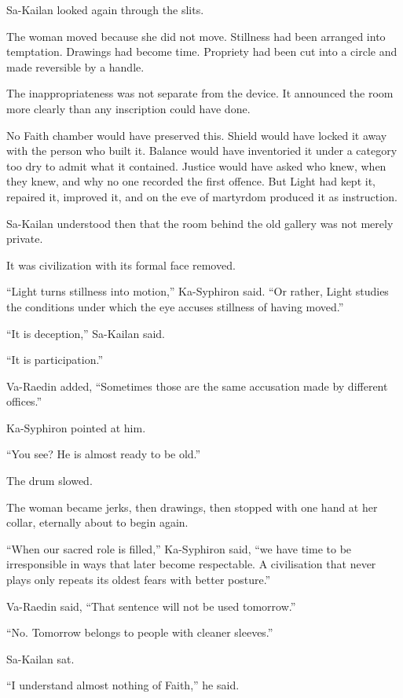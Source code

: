 Sa-Kailan looked again through the slits.\par
The woman moved because she did not move. Stillness had been arranged into temptation. Drawings had become time. Propriety had been cut into a circle and made reversible by a handle.\par
The inappropriateness was not separate from the device. It announced the room more clearly than any inscription could have done.\par
No Faith chamber would have preserved this. Shield would have locked it away with the person who built it. Balance would have inventoried it under a category too dry to admit what it contained. Justice would have asked who knew, when they knew, and why no one recorded the first offence. But Light had kept it, repaired it, improved it, and on the eve of martyrdom produced it as instruction.\par
Sa-Kailan understood then that the room behind the old gallery was not merely private.\par
It was civilization with its formal face removed.\par
“Light turns stillness into motion,” Ka-Syphiron said. “Or rather, Light studies the conditions under which the eye accuses stillness of having moved.”\par
“It is deception,” Sa-Kailan said.\par
“It is participation.”\par
Va-Raedin added, “Sometimes those are the same accusation made by different offices.”\par
Ka-Syphiron pointed at him.\par
“You see? He is almost ready to be old.”\par
The drum slowed.\par
The woman became jerks, then drawings, then stopped with one hand at her collar, eternally about to begin again.\par
“When our sacred role is filled,” Ka-Syphiron said, “we have time to be irresponsible in ways that later become respectable. A civilisation that never plays only repeats its oldest fears with better posture.”\par
Va-Raedin said, “That sentence will not be used tomorrow.”\par
“No. Tomorrow belongs to people with cleaner sleeves.”\par
Sa-Kailan sat.\par
“I understand almost nothing of Faith,” he said.\par
